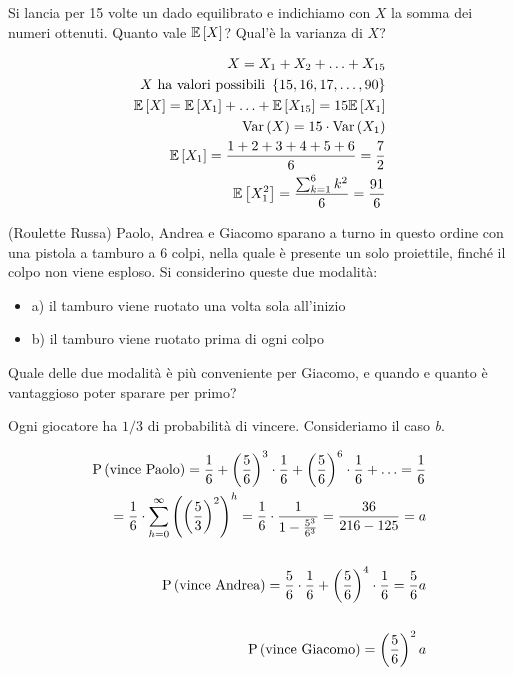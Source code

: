 \begin{exrc}
    Si lancia per 15 volte un dado equilibrato e indichiamo con $ X $ la somma dei numeri ottenuti. Quanto vale \(\mathbb{E}\left[X\right]\)? Qual'\`e la varianza di \(X\)?

    \begin{equation*}
    \begin{aligned}
        X = X_1 + X_2 + \hdots + X_{15} \\
        X \text{ ha valori possibili } \left\{ 15, 16, 17, \hdots, 90\right\} \\
        \mathbb{E}\left[X\right] = \mathbb{E}\left[X_1\right] + \hdots + \mathbb{E}\left[X_{15}\right] = 15 \mathbb{E}\left[X_1\right] \\
        \text{Var}\left(X\right) = 15 \cdot \text{Var}\left(X_1\right) \\
        \mathbb{E}\left[X_1\right] = \dfrac{1 + 2 + 3 + 4 + 5 + 6}{6} = \dfrac{7}{2} \\
        \mathbb{E}\left[X_1^2\right] = \dfrac{\sum_{k=1}^6 k^2}{6} = \dfrac{91}{6}
    \end{aligned}
    \end{equation*}
\end{exrc}

\begin{exrc} (Roulette Russa)
    Paolo, Andrea e Giacomo sparano a turno in questo ordine con una pistola a tamburo a 6 colpi, nella quale \`e presente un solo proiettile, finch\'e il colpo non viene esploso. Si considerino queste due modalit\`a:
    \begin{itemize}
        \item a) il tamburo viene ruotato una volta sola all'inizio
        \item b) il tamburo viene ruotato prima di ogni colpo
    \end{itemize}

    Quale delle due modalit\`a \`e pi\`u conveniente per Giacomo, e quando e quanto \`e vantaggioso poter sparare per primo?

    Ogni giocatore ha \(1/3\) di probabilit\`a di vincere. Consideriamo il caso \textit{b}.

    \begin{equation*}
        \begin{aligned}
            \text{P}\left(\text{vince Paolo}\right) = \frac{1}{6} + \left( \frac{5}{6} \right)^3 \cdot \frac{1}{6} + \left( \frac{5}{6} \right)^6 \cdot \frac{1}{6} + \hdots = \frac{1}{6} \\
            = \frac{1}{6} \cdot \sum_{h=0}^\infty \left( \left( \frac{5}{3} \right)^2 \right)^h = \frac{1}{6} \cdot \frac{1}{1- \frac{5^3}{6^3} } = \frac{36}{216 - 125} = a \\ \\
            \text{P}\left(\text{vince Andrea}\right) = \frac{5}{6} \cdot \frac{1}{6} + \left( \frac{5}{6} \right)^4 \cdot \frac{1}{6} = \frac{5}{6}a \\ \\
            \text{P}\left(\text{vince Giacomo}\right) = \left( \frac{5}{6} \right)^2 a
        \end{aligned}
    \end{equation*}

\end{exrc}


